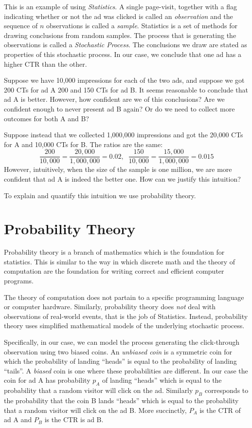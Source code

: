 \documentclass{report}
\theoremstyle{plain}
\theoremstyle{definition}
\begin{document}
This is an example of using {\em Statistics}. A single page-visit,
together with a flag indicating whether or not the ad was clicked is
called an {\em observation} and the sequence of $n$ observations is called
a {\em sample}. Statistics is a set of methods for drawing conclusions
from random samples. The process that is generating the observations
is called a {\em Stochastic Process}. The conclusions we draw are
stated as properties of this stochastic process. In our case, we
conclude that one ad has a higher CTR than the other.

Suppose we have 10,000 impressions for each of the two ads, and
suppose we got 200 CTs for ad A 200 and 150 CTs for ad B. It seems
reasonable to conclude that ad A is better. However, how confident are
we of this conclusions? Are we confident enough to never present ad B
again? Or do we need to collect more outcomes for both A and B?

Suppose instead that we collected 1,000,000 impressions and got the 20,000
CTs for A and 10,000 CTs for B. The ratios are the same:
\[
\frac{200}{10,000} = \frac{20,000}{1,000,000} = 0.02,\;\;
\frac{150}{10,000} = \frac{15,000}{1,000,000} = 0.015
\]
However, intuitively, when the size of the sample is one million, we
are more confident that ad A is indeed the better one. How can we
justify this intuition?

To explain and quantify this intuition we use probability theory.

\section{Probability Theory}

Probability theory is a branch of mathematics which is the foundation
for statistics. This is similar to the way in which discrete math and
the theory of computation are the foundation for writing correct and
efficient computer programs.

The theory of computation does not partain to a specific programming
language or computer hardware. Similarly, probability theory does {\em
  not} deal with observations of real-world events, that is the job of
Statistics. Instead, probability theory uses simplified mathematical
models of the underlying stochastic process.

Specifically, in our case, we can model the process generating the
click-through observation using two biased coins. An {\em unbiased
  coin} is a symmetric coin for which the probability of landing
``heads'' is equal to the probability of landing ``tails''.  A {\em
  biased} coin is one where these probabilities are different.  In our
case the coin for ad A has probability $p_A$ of landing ``heads''
which is equal to the probability that a random visitor will click on
the ad. Similarly $p_B$ corresponds to the probability that the coin B
lands ``heads'' which is equal to the probability that a random
visitor will click on the ad B. More succinctly, $P_A$ is the CTR of
ad A and $P_B$ is the CTR is ad B.
\end{document}
